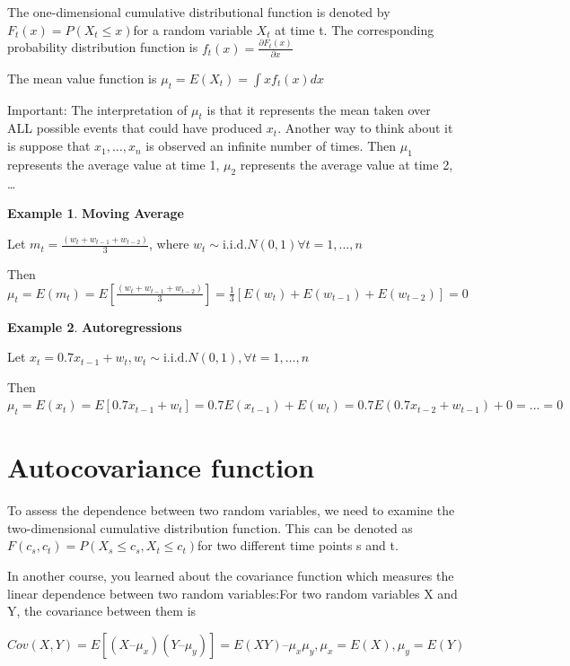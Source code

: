 \documentclass[
]{book}
\theoremstyle{definition}
\theoremstyle{definition}
\newtheorem{example}{Example}[chapter]
\theoremstyle{definition}
\theoremstyle{definition}
\theoremstyle{remark}
\begin{document}
The one-dimensional cumulative distributional function is denoted by \(F_t(x) = P(X_t\leq{x})\)for a random variable \(X_t\) at time t. The corresponding probability distribution function is \(f_t(x)=\frac{\partial{F_t(x)}}{\partial{x}}\)

The mean value function is \(\mu_t=E(X_t)=\int{xf_t(x)dx}\)

Important: The interpretation of \(\mu_t\) is that it represents the mean taken over ALL possible events that could have produced \(x_t\). Another way to think about it is suppose that \(x_1,\dots,x_n\) is observed an infinite number of times. Then \(\mu_1\) represents the average value at time 1, \(\mu_2\) represents the average value at time 2, \ldots{}

\begin{example}
\textbf{Moving Average}

Let \(m_t=\frac{(w_t+w_{t-1}+w_{t-2})}{3}\), where \(w_t\sim\mathrm{i.i.d.}N(0,1)\forall t=1,...,n\)

Then \(\mu_t=E(m_t)=E[\frac{(w_t+w_{t-1}+w_{t-2})}{3}]=\frac{1}{3}[E(w_t)+E(w_{t-1})+E(w_{t-2})]=0\)
\end{example}

\begin{example}
\textbf{Autoregressions}

Let \(x_t = 0.7x_{t-1} + w_t, w_t \sim \mathrm{i.i.d.} N(0,1) ,\forall t = 1, …, n\)

Then \(\mu_t=E(x_t)=E[0.7x_{t-1} + w_t]=0.7E(x_{t-1})+E(w_t)=0.7E(0.7x_{t-2}+w_{t-1})+0=...=0\)
\end{example}

\hypertarget{autocovariance-function}{%
\section{Autocovariance function}\label{autocovariance-function}}

To assess the dependence between two random variables, we need to examine the two-dimensional cumulative distribution function. This can be denoted as \(F(c_s, c_t) = P(X_s\leq{c_s}, X_t\leq{c_t})\)for two different time points s and t.

In another course, you learned about the covariance function which measures the linear dependence between two random variables:For two random variables X and Y, the covariance between them is

\[Cov(X,Y) = E[(X – \mu_x)(Y – \mu_y)] = E(XY) – \mu_x\mu_y,  
\mu_x = E(X) , \mu_y = E(Y)\]
\end{document}
